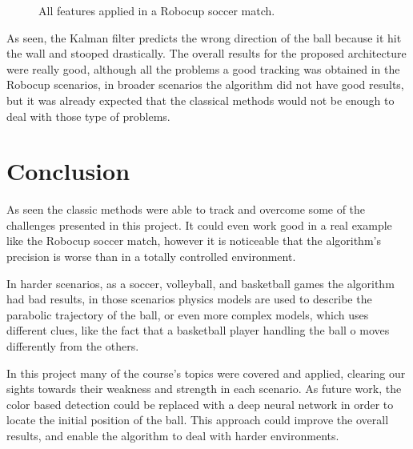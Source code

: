 \documentclass[10pt,twocolumn,letterpaper]{article}
\begin{document}
\begin{figure}[!h]
	\centering
	\setlength{\fboxsep}{1pt}
	\setlength{\fboxrule}{1pt}
	\caption{All features applied in a Robocup soccer match.}\label{fig:robocup2}
\end{figure}

As seen, the Kalman filter predicts the wrong direction of the ball because it hit the wall and stooped drastically. The overall results for the proposed architecture were really good, although all the problems a good tracking was obtained in the Robocup scenarios, in broader scenarios the algorithm did not have good results, but it was already expected that the classical methods would not be enough to deal with those type of problems.

\section{Conclusion}\label{sec:conclusion}

As seen the classic methods were able to track and overcome some of the
challenges presented in this project. It could even work good in a real example like the Robocup soccer match, however it is noticeable that the algorithm's precision is worse than in a totally controlled environment.

In harder scenarios, as a soccer, volleyball, and basketball games the algorithm had  bad results, in those scenarios physics models are used to describe the parabolic trajectory of the ball, or even  more complex models, which uses different clues, like the fact that a basketball player handling the ball o moves differently from the others.

In this project  many of the course's topics were covered and applied, clearing our sights towards their weakness and strength in each scenario. As future work, the color based detection could be replaced with a deep neural network in order to locate the initial position of the ball. This approach could improve the overall results, and enable the algorithm to deal with harder environments.

{\small


}
\end{document}
